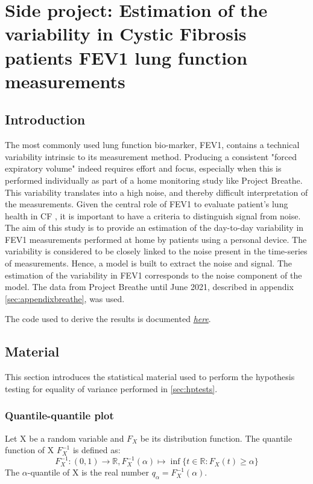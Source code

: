 \chapter{Side project: Estimation of the variability in Cystic Fibrosis patients FEV1 lung function measurements} \label{sec:sideproject}

\section{Introduction}
The most commonly used lung function bio-marker, FEV1, contains a technical variability intrinsic to its measurement method. Producing a consistent "forced expiratory volume" indeed requires effort and focus, especially when this is performed individually as part of a home monitoring study like Project Breathe. This variability translates into a high noise, and thereby difficult interpretation of the measurements. Given the central role of FEV1 to evaluate patient's lung health in CF \cite{giron_2021}, it is important to have a criteria to distinguish signal from noise. The aim of this study is to provide an estimation of the day-to-day variability in FEV1 measurements performed at home by patients using a personal device. The variability is considered to be closely linked to the noise present in the time-series of measurements. Hence, a model is built to extract the noise and signal. The estimation of the variability in FEV1 corresponds to the noise component of the model. The data from Project Breathe until June 2021, described in appendix \ref{sec:appendixbreathe}, was used.

The code used to derive the results is documented \href{https://tristantreb.github.io/master_thesis_CF_ML/}{\textit{here}}.

\section{Material}
This section introduces the statistical material used to perform the hypothesis testing for equality of variance performed in \ref{sec:hptests}.

\subsection{Quantile-quantile plot}
Let X be a random variable and $F_X$ be its distribution function. The quantile function of X $F_X^{-1}$ is defined as:
\begin{equation}
    F_X^{-1} : (0,1) \longrightarrow \mathbb{R}, F_X^{-1}(\alpha) \longmapsto \inf \{ t \in \mathbb{R}: F_X(t) \geq \alpha \}
\end{equation}
The $\alpha$-quantile of X is the real number $q_\alpha = F_X^{-1}(\alpha)$.

